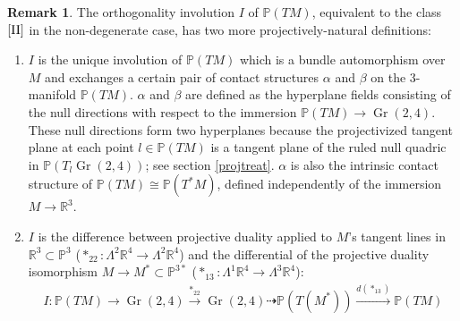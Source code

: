 \documentclass[12pt]{article}
\numberwithin{equation}{section}
\theoremstyle{plain}
\theoremstyle{definition}
\newtheorem{remark}[definition]{Remark}
\renewcommand{\P}{\mathbb{P}}
\renewcommand{\L}{\Lambda}
\newcommand{\R}{\mathbb{R}}
\newcommand{\II}{\textnormal{II}}
\newcommand{\ra}{\rightarrow}
\begin{document}
\begin{remark} The orthogonality involution $I$ of $\P(TM)$, equivalent to the class $[\II]$ in the non-degenerate case, has two more projectively-natural definitions:
\begin{enumerate}
\itemsep0em
\item{$I$ is the unique involution of $\P(TM)$ which is a bundle automorphism over $M$ and exchanges a certain pair of contact structures $\alpha$ and $\beta$ on the 3-manifold $\P(TM)$. $\alpha$ and $\beta$ are defined as the hyperplane fields consisting of the null directions with respect to the immersion $\P(TM)\rightarrow \operatorname{Gr}(2,4)$. These null directions form two hyperplanes because the projectivized tangent plane at each point $l\in \P(TM)$ is a tangent plane of the ruled null quadric in $\P(T_{l}\operatorname{Gr}(2,4))$; see section \ref{projtreat}. $\alpha$ is also the intrinsic contact structure of $\P(TM)\cong \P(T^{*}M)$, defined independently of the immersion $M\ra \R^{3}$.}
\item{$I$ is the difference between projective duality applied to $M$'s tangent lines in $\R^{3}\subset \P^{3}$ ($*_{22}:\L^{2}\R^{4}\ra \L^{2}\R^{4}$) and the differential of the projective duality isomorphism $M\ra M^{*}\subset \P^{3*}$ ($*_{13}:\L^{1}\R^{4}\ra \L^{3}\R^{4}$):
\begin{align*}
I:\P(TM)\ra \operatorname{Gr}(2,4)\overset{*_{22}}{\ra} \operatorname{Gr}(2,4)\dashrightarrow \P(T(M^{*}))\overset{d(*_{13})}{\ra} \P(TM)
\end{align*}
}
\end{enumerate}
\end{remark}
\end{document}
